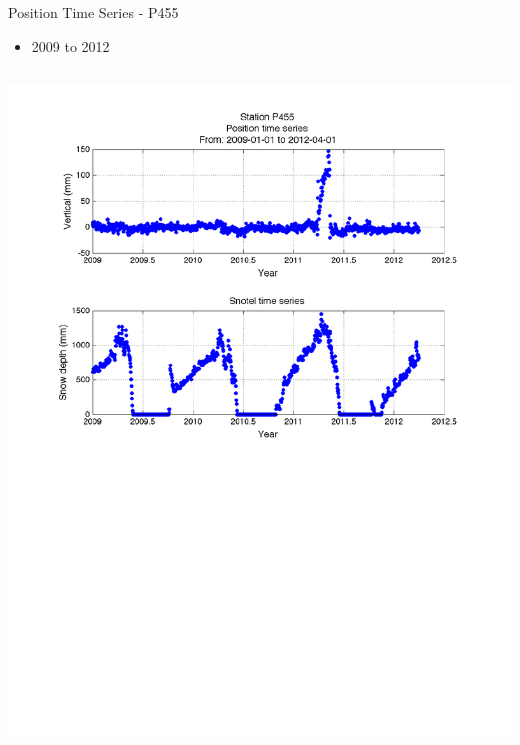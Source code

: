 \documentclass{beamer}
\begin{document}
\begin{frame}{Position Time Series - P455}
\begin{itemize}
\item 2009 to 2012\\
\end{itemize}

\begin{columns}
\includegraphics[width=1\linewidth,trim=70 300 70 50, clip=true]{logan/p455_pos.pdf}


\end{columns}
\end{frame}
\end{document}
